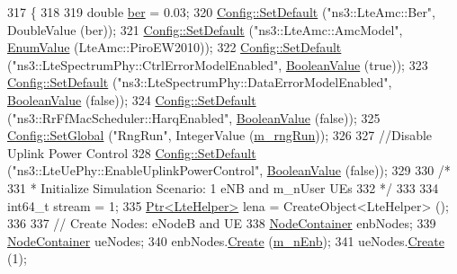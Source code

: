 \begin{DoxyCode}
317 \{
318   
319   \textcolor{keywordtype}{double} \hyperlink{lte__cqi__generation_8m_a197619a3539acfc577325d6e41b6ce95}{ber} = 0.03;
320   \hyperlink{group__config_ga2e7882df849d8ba4aaad31c934c40c06}{Config::SetDefault} (\textcolor{stringliteral}{"ns3::LteAmc::Ber"}, DoubleValue (ber));
321   \hyperlink{group__config_ga2e7882df849d8ba4aaad31c934c40c06}{Config::SetDefault} (\textcolor{stringliteral}{"ns3::LteAmc::AmcModel"}, \hyperlink{classns3_1_1EnumValue}{EnumValue} (LteAmc::PiroEW2010));
322   \hyperlink{group__config_ga2e7882df849d8ba4aaad31c934c40c06}{Config::SetDefault} (\textcolor{stringliteral}{"ns3::LteSpectrumPhy::CtrlErrorModelEnabled"}, 
      \hyperlink{classns3_1_1BooleanValue}{BooleanValue} (\textcolor{keyword}{true}));
323   \hyperlink{group__config_ga2e7882df849d8ba4aaad31c934c40c06}{Config::SetDefault} (\textcolor{stringliteral}{"ns3::LteSpectrumPhy::DataErrorModelEnabled"}, 
      \hyperlink{classns3_1_1BooleanValue}{BooleanValue} (\textcolor{keyword}{false}));
324   \hyperlink{group__config_ga2e7882df849d8ba4aaad31c934c40c06}{Config::SetDefault} (\textcolor{stringliteral}{"ns3::RrFfMacScheduler::HarqEnabled"}, 
      \hyperlink{classns3_1_1BooleanValue}{BooleanValue} (\textcolor{keyword}{false}));
325   \hyperlink{group__config_ga0e12663a7bd119b65d0a219a578f2a3c}{Config::SetGlobal} (\textcolor{stringliteral}{"RngRun"}, IntegerValue (\hyperlink{classLenaDlCtrlPhyErrorModelTestCase_ad755d559a1b44822080b2698bcc85fc1}{m\_rngRun}));
326 
327   \textcolor{comment}{//Disable Uplink Power Control}
328   \hyperlink{group__config_ga2e7882df849d8ba4aaad31c934c40c06}{Config::SetDefault} (\textcolor{stringliteral}{"ns3::LteUePhy::EnableUplinkPowerControl"}, 
      \hyperlink{classns3_1_1BooleanValue}{BooleanValue} (\textcolor{keyword}{false}));
329 
330   \textcolor{comment}{/*}
331 \textcolor{comment}{   * Initialize Simulation Scenario: 1 eNB and m\_nUser UEs}
332 \textcolor{comment}{   */}
333 
334   int64\_t stream = 1;
335   \hyperlink{classns3_1_1Ptr}{Ptr<LteHelper>} lena = CreateObject<LteHelper> ();
336   
337   \textcolor{comment}{// Create Nodes: eNodeB and UE}
338   \hyperlink{classns3_1_1NodeContainer}{NodeContainer} enbNodes;
339   \hyperlink{classns3_1_1NodeContainer}{NodeContainer} ueNodes;
340   enbNodes.\hyperlink{classns3_1_1NodeContainer_a787f059e2813e8b951cc6914d11dfe69}{Create} (\hyperlink{classLenaDlCtrlPhyErrorModelTestCase_a761b34bd4869ebf6d1a5bd78da392fbb}{m\_nEnb});
341   ueNodes.\hyperlink{classns3_1_1NodeContainer_a787f059e2813e8b951cc6914d11dfe69}{Create} (1);

\end{DoxyCode}
